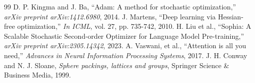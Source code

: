 \documentclass[10pt,twocolumn,letterpaper]{article}
\begin{document}
{\small

\begin{thebibliography}{99}
 D. P. Kingma and J. Ba, ``Adam: A method for stochastic optimization,'' \textit{arXiv preprint arXiv:1412.6980}, 2014.
 J. Martens, ``Deep learning via Hessian-free optimization,'' \textit{In ICML}, vol. 27, pp. 735-742, 2010.
 H. Liu et al., ``Sophia: A Scalable Stochastic Second-order Optimizer for Language Model Pre-training,'' \textit{arXiv preprint arXiv:2305.14342}, 2023.
 A. Vaswani, et al., ``Attention is all you need,'' \textit{Advances in Neural Information Processing Systems}, 2017.
 J. H. Conway and N. J. Sloane, \textit{Sphere packings, lattices and groups}, Springer Science \& Business Media, 1999.
\end{thebibliography}
}
\end{document}
